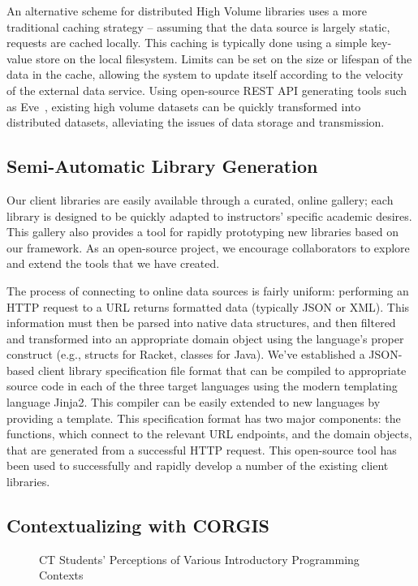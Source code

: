 An alternative scheme for distributed High Volume libraries uses a more traditional caching strategy -- assuming that the data source is largely static, requests are cached locally.
This caching is typically done using a simple key-value store on the local filesystem.
Limits can be set on the size or lifespan of the data in the cache, allowing the system to update itself according to the velocity of the external data service.
Using open-source REST API generating tools such as Eve~\cite{Eve}, existing high volume datasets can be quickly transformed into distributed datasets, alleviating the issues of data storage and transmission.

\subsection{Semi-Automatic Library Generation}

Our client libraries are easily available through a curated, online gallery; each library is designed to be quickly adapted to instructors' specific academic desires. 
This gallery also provides a tool for rapidly prototyping new libraries based on our framework.
As an open-source project, we encourage collaborators to explore and extend the tools that we have created.

The process of connecting to online data sources is fairly uniform: performing an HTTP request to a URL returns formatted data (typically JSON or XML). 
This information must then be parsed into native data structures, and then filtered and transformed into an appropriate domain object using the language's proper construct (e.g., structs for Racket, classes for Java).
We've established a JSON-based client library specification file format that can be compiled to appropriate source code in each of the three target languages using the modern templating language Jinja2. 
This compiler can be easily extended to new languages by providing a template.
This specification format has two major components: the functions, which connect to the relevant URL endpoints, and the domain objects, that are generated from a successful HTTP request. 
This open-source tool has been used to successfully and rapidly develop a number of the existing client libraries.

\subsection{Contextualizing with CORGIS}

\begin{figure}
		\begin{center}
		\end{center}
		\caption{CT Students' Perceptions of Various Introductory Programming Contexts}
		\label{fig-contexts-compared}
\end{figure}

